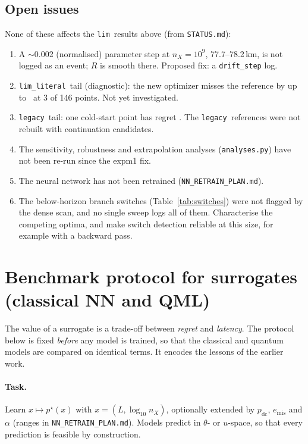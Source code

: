 \documentclass[11pt,a4paper]{article}
\newcommand{\plim}{\texttt{lim}}
\newcommand{\limlit}{\texttt{lim\_literal}}
\newcommand{\legacy}{\texttt{legacy}}
\begin{document}
\subsection{Open issues}
None of these affects the \plim\ results above (from \texttt{STATUS.md}):
\begin{enumerate}
\item A $\sim$0.002 (normalised) parameter step at $n_X=10^9$, 77.7--78.2\,km, is not logged as an event; $R$ is
  smooth there. Proposed fix: a \texttt{drift\_step} log.
\item \limlit\ tail (diagnostic): the new optimizer misses the reference by up to
  \QKDLimLiteralTailNewColdRegretMax\ at 3 of 146 points. Not yet investigated.
\item \legacy\ tail: one cold-start point has regret \QKDLegacyTailNewColdRegretMax. The \legacy\ references were
  not rebuilt with continuation candidates.
\item The sensitivity, robustness and extrapolation analyses (\texttt{analyses.py}) have not been re-run since the
  expm1 fix.
\item The neural network has not been retrained (\texttt{NN\_RETRAIN\_PLAN.md}).
\item The below-horizon branch switches (Table~\ref{tab:switches}) were not flagged by the dense scan, and no single
  sweep logs all of them. Characterise the competing optima, and make switch detection reliable at this size, for
  example with a backward pass.
\end{enumerate}

\section{Benchmark protocol for surrogates (classical NN and QML)}\label{sec:qml}
The value of a surrogate is a trade-off between \emph{regret} and \emph{latency}. The protocol below is fixed
\emph{before} any model is trained, so that the classical and quantum models are compared on identical terms. It
encodes the lessons of the earlier work.

\paragraph{Task.} Learn $x\mapsto p^\star(x)$ with $x=(L,\log_{10}n_X)$, optionally extended by
$p_{\mathrm{dc}}$, $e_{\mathrm{mis}}$ and $\alpha$ (ranges in \texttt{NN\_RETRAIN\_PLAN.md}). Models predict in
$\theta$- or $u$-space, so that every prediction is feasible by construction.
\end{document}
